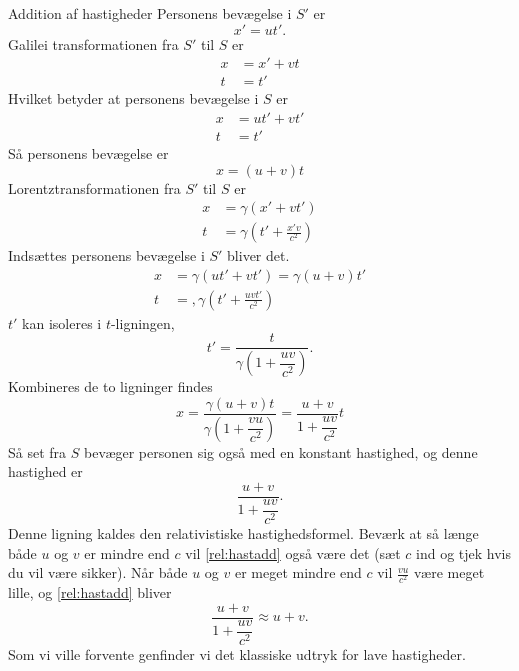 \begin{opgave}{Addition af hastigheder}
    \opg Personens bevægelse i $S'$ er
    $$
    x'=ut'.
    $$
    \opg
    Galilei transformationen fra $S'$ til $S$ er
    \begin{align*}
        x&=x'+vt\\
        t&=t'
    \end{align*}
    Hvilket betyder at personens bevægelse i $S$ er
    \begin{align*}
        x&=ut'+vt'\\
        t&=t'
    \end{align*}
    Så personens bevægelse er
    \[
    x=(u+v)t
    \]
    \opg
    Lorentztransformationen fra $S'$ til $S$ er
    \begin{align*}
        x&=\gamma(x'+vt')\\
        t&=\gamma\left(t'+\frac{x'v}{c^2}\right)
    \end{align*}
    Indsættes personens bevægelse i $S'$ bliver det.
    \begin{align*}
        x&=\gamma (ut'+vt')=\gamma(u+v)t'\\
        t&=,\gamma\left(t'+\frac{uvt'}{c^2}\right)
    \end{align*}
    $t'$ kan isoleres i $t$-ligningen,
    \[
    t'=\dfrac{t}{\gamma\left(1+\dfrac{uv}{c^2}\right)}.
    \]
    Kombineres de to ligninger findes
    \[
    x=\dfrac{\gamma(u+v)t}{\gamma\left(1+\dfrac{vu}{c^2}\right)}=\dfrac{u+v}{1+\dfrac{uv}{c^2}}t
    \]
    Så set fra $S$ bevæger personen sig også med en konstant hastighed, og denne hastighed er
    \begin{equation}
    \dfrac{u+v}{1+\dfrac{uv}{c^2}}.\label{rel:hastadd}
    \end{equation}
    Denne ligning kaldes den relativistiske  hastighedsformel.
    Beværk at så længe både $u$ og $v$ er mindre end $c$ vil \eqref{rel:hastadd} også være det
    (sæt $c$ ind og tjek hvis du vil være sikker).
    \opg Når både $u$ og $v$ er meget mindre end $c$ vil $\frac{vu}{c^2}$ være meget lille, og \eqref{rel:hastadd} bliver
    \begin{equation*}
    \dfrac{u+v}{1+\dfrac{uv}{c^2}}\approx u+v.
    \end{equation*}
    Som vi ville forvente genfinder vi det klassiske udtryk for lave hastigheder.
\end{opgave}

